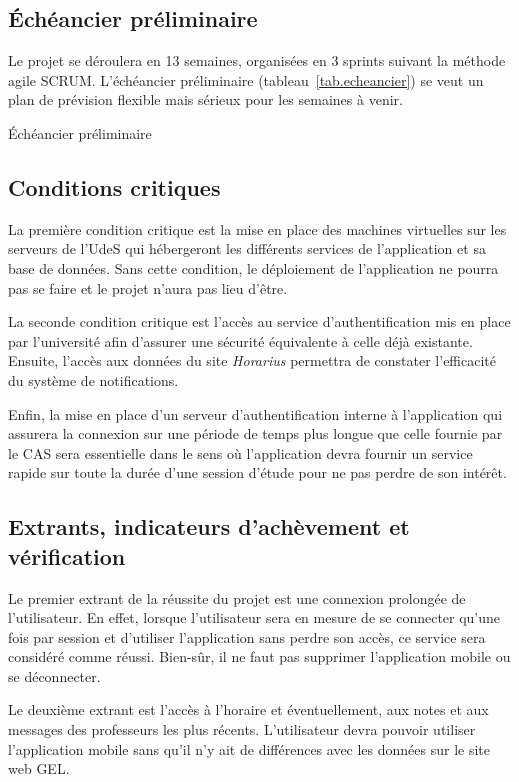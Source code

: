 	\subsection{Échéancier préliminaire}
	Le projet se déroulera en 13 semaines, organisées en 3 sprints suivant la méthode agile SCRUM. L'échéancier préliminaire (tableau~\ref{tab.echeancier}) se veut un plan de prévision flexible mais sérieux pour les semaines à venir.
	\begin{table}[hp]
		\centering
		\caption{Échéancier préliminaire}
		
		\label{tab.echeancier}
	\end{table}

	\subsection{Conditions critiques}
	La première condition critique est la mise en place des machines virtuelles sur les serveurs de l'UdeS qui hébergeront les différents services de l'application et sa base de données. Sans cette condition, le déploiement de l'application ne pourra pas se faire et le projet n'aura pas lieu d'être.

	La seconde condition critique est l'accès au service d'authentification mis en place par l'université afin d'assurer une sécurité équivalente à celle déjà existante. Ensuite, l'accès aux données du site \emph{Horarius} permettra de constater l'efficacité du système de notifications.

	Enfin, la mise en place d'un serveur d'authentification interne à l'application qui assurera la connexion sur une période de temps plus longue que celle fournie par le CAS sera essentielle dans le sens où l'application devra fournir un service rapide sur toute la durée d'une session d’étude pour ne pas perdre de son intérêt.

	\subsection{Extrants, indicateurs d'achèvement et vérification}
	Le premier extrant de la réussite du projet est une connexion prolongée de l’utilisateur. En effet, lorsque l’utilisateur sera en mesure de se connecter qu’une fois par session et d’utiliser l’application sans perdre son accès, ce service sera considéré comme réussi. Bien-sûr, il ne faut pas supprimer l’application mobile ou se déconnecter.

	Le deuxième extrant est l’accès à l’horaire et éventuellement, aux notes et aux messages des professeurs les plus récents. L’utilisateur devra pouvoir utiliser l’application mobile sans qu'il n'y ait de différences avec les données sur le site web GEL.

